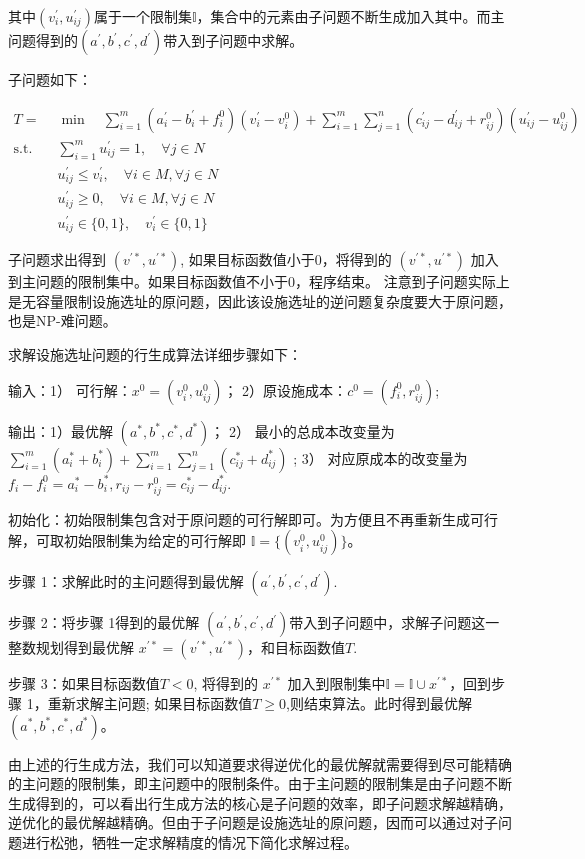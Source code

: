 \documentclass[UTF8]{article}
\begin{document}
其中$(v_i^{'},u_{ij}^{'})$属于一个限制集$\mathbb{I}$，集合中的元素由子问题不断生成加入其中。而主问题得到的$(a^{'},b^{'},c^{'},d^{'})$带入到子问题中求解。

子问题如下：

\begin{align*}
T = &\min \quad \sum_{i=1}^m(a_i^{'}-b_i^{'}+f_i^0)(v_i^{'}-v_i^{0})+\sum_{i=1}^m\sum_{j=1}^n(c_{ij}^{'}-d_{ij}^{'}+r_{ij}^0)(u_{ij}^{'}-u_{ij}^{0}) \\
\text{s.t.}\quad & \sum_{i=1}^m u_{ij}^{'} =1, \quad \forall j\in N \\
& u_{ij}^{'} \leq v_{i}^{'}, \quad \forall i \in M, \forall j \in N \\
& u_{ij}^{'} \geq 0, \quad \forall i \in M, \forall j \in N \\
&u_{ij}^{'} \in \{0,1\} ,\quad v_{i}^{'} \in \{0,1\}
\end{align*}

子问题求出得到 $(v^{'*},u^{'*})$, 如果目标函数值小于0，将得到的 $(v^{'*},u^{'*})$ 加入到主问题的限制集中。如果目标函数值不小于0，程序结束。
注意到子问题实际上是无容量限制设施选址的原问题，因此该设施选址的逆问题复杂度要大于原问题，也是NP-难问题。

求解设施选址问题的行生成算法详细步骤如下：

输入：1） 可行解：$x^0=(v_i^0,u_{ij}^0)$； 2）原设施成本：$c^0=(f_i^0,r_{ij}^0)$;

输出：1）最优解 $(a^{*},b^{*},c^{*},d^{*})$；
2） 最小的总成本改变量为
$\sum_{i=1}^m(a^{*}_i+b^{*}_i)+\sum_{i=1}^m\sum_{j=1}^n(c^{*}_{ij}+d^{*}_{ij})$ ;
3） 对应原成本的改变量为 $f_i-f_i^0 = a^{*}_i-b^{*}_i,r_{ij}-r_{ij}^0=c^{*}_{ij}-d^{*}_{ij}$.

初始化：初始限制集包含对于原问题的可行解即可。为方便且不再重新生成可行解，可取初始限制集为给定的可行解即 $\mathbb{I} = \{(v_i^0,u_{ij}^0)\} $。

步骤 1：求解此时的主问题得到最优解 $(a^{'},b^{'},c^{'},d^{'})$.

步骤 2：将步骤 1得到的最优解 $(a^{'},b^{'},c^{'},d^{'})$带入到子问题中，求解子问题这一整数规划得到最优解 $x^{'*}=(v^{'*},u^{'*})$，和目标函数值$T$.

步骤 3：如果目标函数值$T< 0$, 将得到的 $x^{'*}$ 加入到限制集中$\mathbb{I} = \mathbb{I} \cup x^{'*}$，回到步骤 1，重新求解主问题;  如果目标函数值$T\geq 0$,则结束算法。此时得到最优解$(a^{*},b^{*},c^{*},d^{*})$。


由上述的行生成方法，我们可以知道要求得逆优化的最优解就需要得到尽可能精确的主问题的限制集，即主问题中的限制条件。由于主问题的限制集是由子问题不断生成得到的，可以看出行生成方法的核心是子问题的效率，即子问题求解越精确，逆优化的最优解越精确。但由于子问题是设施选址的原问题，因而可以通过对子问题进行松弛，牺牲一定求解精度的情况下简化求解过程。
\end{document}
